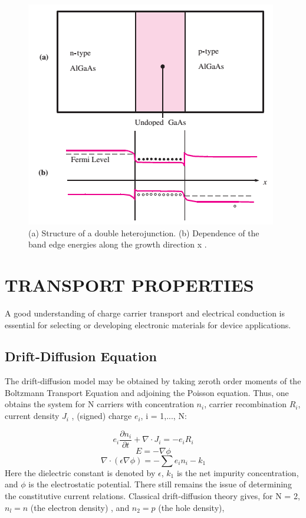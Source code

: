 \documentclass[%
reprint,
amsmath,amssymb,
aps,
]{revtex4-1}
\begin{document}
\begin{figure}[!h]
	\centering
	\includegraphics[scale=0.81]{STRUCTURE.png}
	\caption{(a) Structure of a double heterojunction. (b) Dependence of the band
		edge energies along the growth direction x \cite{yuyu}.
		\label{structure}}
\end{figure}


	
	
\section{TRANSPORT PROPERTIES}
A good understanding of charge carrier transport and electrical conduction is essential for selecting or developing electronic materials for device applications. 
	
\subsection{Drift-Diffusion Equation}

The drift-diffusion model may be obtained by taking zeroth order moments of the  Boltzmann Transport Equation and adjoining the Poisson equation. Thus, one obtains the system for N carriers with concentration $ n_i $, carrier recombination $ R_i $, current density $ J_i $ , (signed) charge $ e_i $, i = 1,..., N:
	
\begin{equation}
		e_i\dfrac{\partial n_i }{\partial t} + \nabla \cdot	  J_i = -e_i R_i
\end{equation}
\begin{equation}
		E =- \nabla\phi
\end{equation}
\begin{equation}
	\nabla \cdot(\epsilon\nabla\phi) = -\sum e_i n_i - k_1
\end{equation}
Here the dielectric constant is denoted by $ \epsilon $, $ k_1 $ is the net impurity concentration, and $ \phi $ is the electrostatic potential. There still remains the issue of determining the constitutive current relations. Classical drift-diffusion theory gives, for N = 2, $ n_l  = n$ (the electron density) , and $ n_2  = p$ (the hole density),
	
\end{document}
